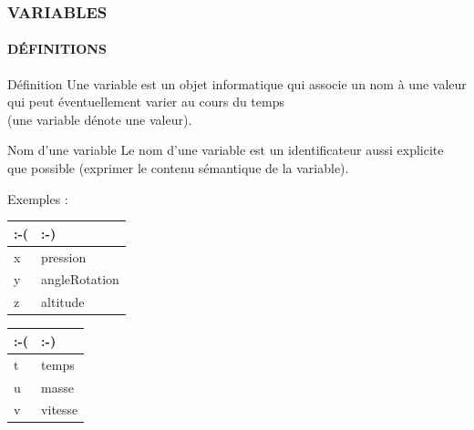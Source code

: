 \begin{frame}
\frametitle{\uppercase{Variables}}
\framesubtitle{\uppercase{Définitions}}
\begin{block}{Définition}
Une variable est un objet informatique qui associe un nom à une valeur 
qui peut éventuellement varier au cours du temps\\
(\alert{une variable dénote une valeur}).
\end{block}

\begin{block}{Nom d'une variable}
Le nom d'une variable est un identificateur aussi explicite que possible 
(\alert{exprimer le contenu sémantique de la variable}).

Exemples : 
\tt \begin{tabular}[t]{|l|l|}
\hline
\alert{:-(} & \alert{:-)} \\
\hline
x & pression \\
y & angleRotation \\
z & altitude \\
\hline
\end{tabular}\hspace*{1cm}%
\begin{tabular}[t]{|l|l|}
\hline
\alert{:-(} & \alert{:-)} \\
\hline
t & temps \\
u & masse \\
v & vitesse \\
\hline
\end{tabular}

\end{block}

\end{frame}


